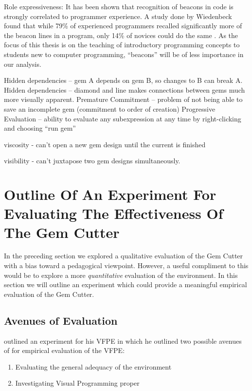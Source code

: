 Role expressiveness:
It has been shown that recognition of beacons in code is strongly correlated to programmer experience.  A study done by Wiedenbeck found that while 79\% of experienced programmers recalled significantly more of the beacon lines in a program, only 14\% of novices could do the same \cite{Wiedenbeck91}.  As the focus of this thesis is on the teaching of introductory programming concepts to students new to computer programming, ``beacons'' will be of less importance in our analysis.


Hidden dependencies -- gem A depends on gem B, so changes to B can break A.
Hidden dependencies -- diamond and line makes connections between gems much more visually apparent.
Premature Commitment -- problem of not being able to save an incomplete gem (commitment to order of creation)
Progressive Evaluation -- ability to evaluate any subexpression at any time by right-clicking and choosing ``run gem''

viscosity - can't open a new gem design until the current is finished

visibility - can't juxtapose two gem designs simultaneously.

\section{Outline Of An Experiment For Evaluating The Effectiveness Of The Gem Cutter}

In the preceding section we explored a qualitative evaluation of the Gem Cutter with a bias toward a pedagogical viewpoint.  However, a useful compliment to this would be to explore a more \emph{quantitative} evaluation of the environment.  In this section we will outline an experiment which could provide a meaningful empirical evaluation of the Gem Cutter.

\subsection{Avenues of Evaluation}

\cite{Kelso02} outlined an experiment for his VFPE in which he outlined two possible avenues of for empirical evaluation of the VFPE:

\begin{enumerate}
	\item Evaluating the general adequacy of the environment
	\item Investigating Visual Programming proper
\end{enumerate}

